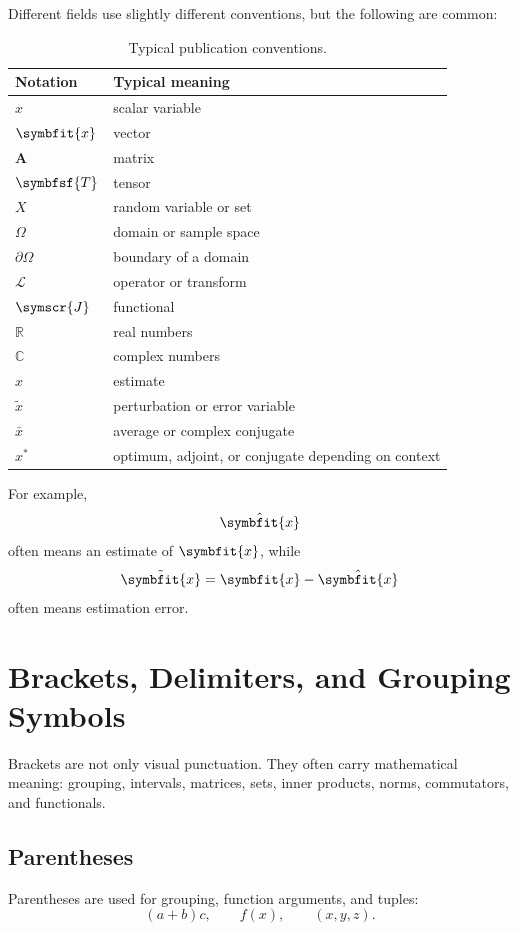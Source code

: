 \documentclass[11pt,twocolumn]{article}
\newcommand{\vct}[1]{\symbfit{#1}}   %
\newcommand{\mat}[1]{\symbf{#1}}     %
\newcommand{\ten}[1]{\symbfsf{#1}}   %
\begin{document}
Different fields use slightly different conventions, but the following are
common:

\begin{table}[ht]
\centering
\caption{Typical publication conventions.}
\begin{tabular}{ll}
\toprule
Notation & Typical meaning \\
\midrule
$x$ & scalar variable \\
$\vct{x}$ & vector \\
$\mat{A}$ & matrix \\
$\ten{T}$ & tensor \\
$X$ & random variable or set \\
$\Omega$ & domain or sample space \\
$\partial\Omega$ & boundary of a domain \\
$\mathcal{L}$ & operator or transform \\
$\symscr{J}$ & functional \\
$\mathbb{R}$ & real numbers \\
$\mathbb{C}$ & complex numbers \\
$\hat{x}$ & estimate \\
$\tilde{x}$ & perturbation or error variable \\
$\bar{x}$ & average or complex conjugate \\
$x^{*}$ & optimum, adjoint, or conjugate depending on context \\
\bottomrule
\end{tabular}
\end{table}

For example,
\[
\hat{\vct{x}}
\]
often means an estimate of \(\vct{x}\), while
\[
\tilde{\vct{x}}
=
\vct{x}
-
\hat{\vct{x}}
\]
often means estimation error.

\section{Brackets, Delimiters, and Grouping Symbols}

Brackets are not only visual punctuation. They often carry mathematical
meaning: grouping, intervals, matrices, sets, inner products, norms,
commutators, and functionals.

\subsection{Parentheses}

Parentheses are used for grouping, function arguments, and tuples:
\[
(a+b)c,
\qquad
f(x),
\qquad
(x,y,z).
\]
\end{document}
